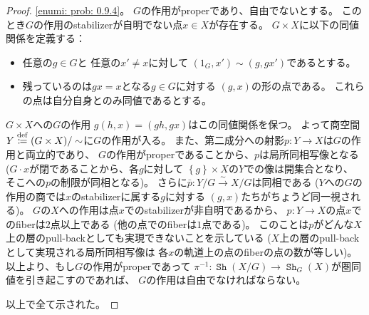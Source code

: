 \documentclass[uplatex]{jsarticle}
\theoremstyle{definition}
\newcommand{\dfn}{\overset{\mathrm{\tiny def}}{\coloneqq}}
\DeclareMathOperator{\Sh}{\mathtt{Sh}}
\begin{document}
\begin{proof}
  \ref{enumi: prob: 0.9.4}。
  \(G\)の作用がproperであり、自由でないとする。
  このとき\(G\)の作用のstabilizerが自明でない点\(x\in X\)が存在する。
  \(G\times X\)に以下の同値関係を定義する：
  \begin{itemize}
    \item
    任意の\(g\in G\)と
    任意の\(x'\neq x\)に対して
    \((1_G,x')\sim (g,gx')\)であるとする。
    \item
    残っているのは\(gx=x\)となる\(g\in G\)に対する
    \((g,x)\)の形の点である。
    これらの点は自分自身とのみ同値であるとする。
  \end{itemize}
  \(G\times X\)への\(G\)の作用
  \(g(h,x) = (gh,gx)\)はこの同値関係を保つ。
  よって商空間\(Y\dfn (G\times X)/\sim\)に\(G\)の作用が入る。
  また、第二成分への射影\(p:Y\to X\)は\(G\)の作用と両立的であり、
  \(G\)の作用がproperであることから、\(p\)は局所同相写像となる
  (\(G\cdot x\)が閉であることから、各\(g\)に対して
  \(\left\{ g\right\} \times X\)の\(Y\)での像は開集合となり、
  そこへの\(p\)の制限が同相となる)。
  さらに\(\bar{p}:Y/G\xrightarrow{\sim} X/G\)は同相である
  (\(Y\)への\(G\)の作用の商では\(x\)のstabilizerに属する\(g\)に対する
  \((g,x)\)たちがちょうど同一視される)。
  \(G\)の\(X\)への作用は点\(x\)でのstabilizerが非自明であるから、
  \(p:Y\to X\)の点\(x\)でのfiberは\(2\)点以上である
  (他の点でのfiberは\(1\)点である)。
  このことは\(p\)がどんな\(X\)上の層のpull-backとしても実現できないことを示している
  (\(X\)上の層のpull-backとして実現される局所同相写像は
  各\(x\)の軌道上の点のfiberの点の数が等しい)。
  以上より、もし\(G\)の作用がproperであって
  \(\pi^{-1}:\Sh(X/G) \to \Sh_G(X)\)が圏同値を引き起こすのであれば、
  \(G\)の作用は自由でなければならない。

  以上で全て示された。
\end{proof}
\end{document}
